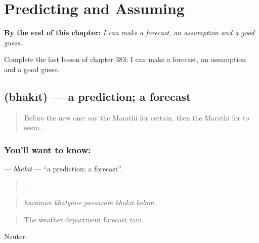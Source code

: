 
\chapter{Predicting and Assuming}
\label{ch:mr-predicting-and-assuming}

\begin{chapteropening}
\textbf{By the end of this chapter:} \emph{I can make a forecast, an assumption and a good guess.}

Complete the last lesson of chapter 383: I can make a forecast, an assumption and a good guess.
\end{chapteropening}

\section[\texorpdfstring{\mr{भाकीत} (bhākīt)}{भाकीत (bhākīt)}]{ (bhākīt) — a prediction; a forecast}

\label{lesson:MR-C383-bhakit}



\begin{quote}
Before the new one: say the Marathi for certain, then the Marathi for to seem.
\end{quote}

\subsection*{You'll want to know: }
\textbf{} — \emph{bhākīt} — \textquotedblleft{}a prediction; a forecast\textquotedblright{}.

\begin{quote}
    .
\end{quote}

\begin{quote}
\emph{havāmān khātyāne pāvsācaṁ bhākīt kelaṁ.}
\end{quote}

\begin{quote}
The weather department forecast rain.
\end{quote}

Neuter.

